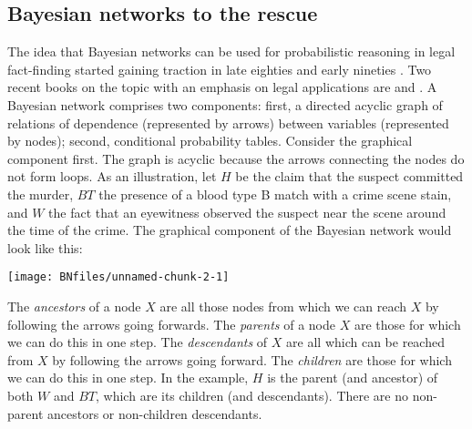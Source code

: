 \documentclass{article}
\begin{document}
\subsection{Bayesian networks to the rescue}  

The idea that Bayesian networks can be used for probabilistic reasoning in legal fact-finding started gaining traction in late eighties \citep{Friedman1986A-diagrammatic-} and early nineties
\citep{Edwards1991Influence-diagr}. Two recent books on the topic with an emphasis on legal applications are   \citep{Fenton2018Risk} and \citep{taroni2006bayesian}. 
%
A Bayesian network comprises two components: first, a directed acyclic graph of relations of dependence (represented by arrows) between variables (represented by nodes); second,  conditional probability tables. 
Consider the graphical component first. The graph is acyclic because the arrows connecting the nodes do not form loops. 
%
As an illustration,  let \(H\) be the claim that the suspect committed the murder, \(BT\) the presence of a blood type B match with a crime scene stain, and \(W\) the fact that an eyewitness observed the suspect near the scene around the time of the crime. The graphical component of the Bayesian network would look like this:
%
\begin{center}\texttt{[image: BNfiles/unnamed-chunk-2-1]} \end{center}
%
The \emph{ancestors} of a node \(X\) are all those nodes from
which we can reach \(X\) by following the arrows going forwards. The
\textit{parents} of a node \(X\) are those for which we can do this in one step.
The \textit{descendants} of \(X\) are all which can be reached from \(X\) by
following the arrows going forward. The \textit{children} are those for
which we can do this in one step. In the example,
$H$ is the parent (and ancestor) of both $ W$ and $BT$, which are its children (and descendants). There are no non-parent ancestors or non-children
descendants. %
\end{document}
